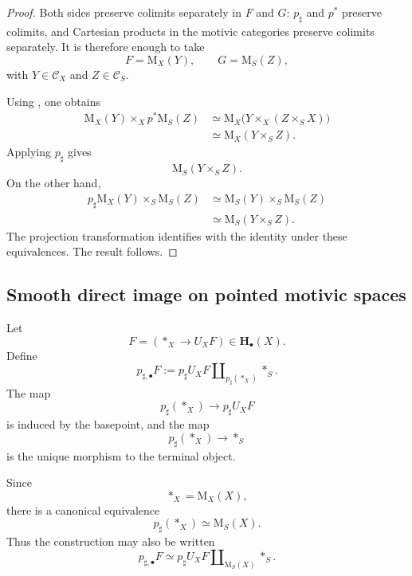 \begin{proof}
Both sides preserve colimits separately in \(F\) and \(G\):
\(p_\sharp\) and \(p^*\) preserve colimits, and Cartesian products in
the motivic categories preserve colimits separately.  It is therefore
enough to take
\[
    F=\mathrm M_X(Y),
    \qquad
    G=\mathrm M_S(Z),
\]
with \(Y\in\mathcal C_X\) and \(Z\in\mathcal C_S\).

Using
,
one obtains
\[
\begin{aligned}
    \mathrm M_X(Y)
    \times_X
    p^*\mathrm M_S(Z)
    &\simeq
    \mathrm M_X
    \bigl(
        Y\times_X(Z\times_SX)
    \bigr)
    \\
    &\simeq
    \mathrm M_X(Y\times_SZ).
\end{aligned}
\]
Applying \(p_\sharp\) gives
\[
    \mathrm M_S(Y\times_SZ).
\]
On the other hand,
\[
\begin{aligned}
    p_\sharp\mathrm M_X(Y)
    \times_S
    \mathrm M_S(Z)
    &\simeq
    \mathrm M_S(Y)
    \times_S
    \mathrm M_S(Z)
    \\
    &\simeq
    \mathrm M_S(Y\times_SZ).
\end{aligned}
\]
The projection transformation identifies with the identity under these
equivalences.  The result follows.
\end{proof}

\subsection{Smooth direct image on pointed motivic spaces}

\begin{construction}
\label{con:pointed-smooth-direct-image}
Let
\[
    F
    =
    (*_X\to U_XF)
    \in
    \mathbf H_\bullet(X).
\]
Define
\[
    p_{\sharp,\bullet}F
    :=
    p_\sharp U_XF
    \amalg_{p_\sharp(*_X)}
    *_S.
\]
The map
\[
    p_\sharp(*_X)
    \longrightarrow
    p_\sharp U_XF
\]
is induced by the basepoint, and the map
\[
    p_\sharp(*_X)
    \longrightarrow
    *_S
\]
is the unique morphism to the terminal object.
\end{construction}

Since
\[
    *_X
    =
    \mathrm M_X(X),
\]
there is a canonical equivalence
\[
    p_\sharp(*_X)
    \simeq
    \mathrm M_S(X).
\]
Thus the construction may also be written
\[
    p_{\sharp,\bullet}F
    \simeq
    p_\sharp U_XF
    \amalg_{\mathrm M_S(X)}
    *_S.
\]

